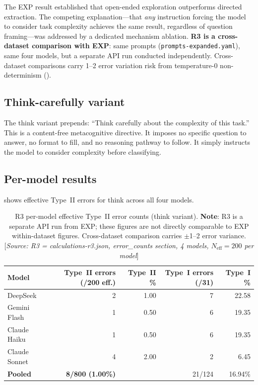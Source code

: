 \documentclass[11pt,a4paper]{article}
\begin{document}
The EXP result established that open-ended exploration outperforms
directed extraction.  The competing explanation---that \emph{any} instruction
forcing the model to consider task complexity achieves the same result,
regardless of question framing---was addressed by a dedicated mechanism
ablation.  \textbf{R3 is a cross-dataset comparison with EXP}: same prompts
(\texttt{prompts-expanded.yaml}), same four models, but a separate API run
conducted independently.  Cross-dataset comparisons carry 1--2 error
variation risk from temperature-0 non-determinism ().

\subsection{Think-carefully variant}

The \textsf{think} variant prepends: ``Think carefully about the complexity
of this task.''  This is a content-free metacognitive directive.  It imposes
no specific question to answer, no format to fill, and no reasoning pathway
to follow.  It simply instructs the model to consider complexity before
classifying.

\subsection{Per-model results}

 shows effective Type~II errors for \textsf{think}
across all four models.

\begin{table}[htbp]
\centering
\caption{R3 per-model effective Type~II error counts (\textsf{think} variant).
  \textbf{Note}: R3 is a separate API run from EXP; these figures are not
  directly comparable to EXP within-dataset figures.  Cross-dataset
  comparison carries $\pm$1--2 error variance.
  [\emph{Source: R3 = calculations-r3.json, error\_counts section,
  4 models, $N_\text{eff} = 200$ per model}]}
\label{tab:r3_errors}
\smallskip
\begin{tabular}{@{}lrrrr@{}}
\toprule
Model & Type~II errors (/200 eff.) & Type~II \% & Type~I errors (/31) & Type~I \% \\
\midrule
DeepSeek       & 2 & 1.00 &  7 & 22.58 \\
Gemini Flash   & 1 & 0.50 &  6 & 19.35 \\
Claude Haiku   & 1 & 0.50 &  6 & 19.35 \\
Claude Sonnet  & 4 & 2.00 &  2 &  6.45 \\
\midrule
\textbf{Pooled} & \textbf{8/800 (1.00\%)} & & 21/124 & 16.94\% \\
\bottomrule
\end{tabular}
\end{table}
\end{document}
